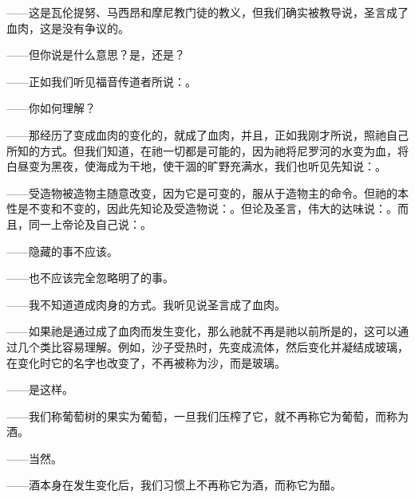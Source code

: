 ——这是瓦伦提努、马西昂和摩尼教门徒的教义，但我们确实被教导说，圣言成了血肉，这是没有争议的。\par

——但你说是什么意思？是，还是？\par

——正如我们听见福音传道者所说：。\par

——你如何理解？\par

——那经历了变成血肉的变化的，就成了血肉，并且，正如我刚才所说，照祂自己所知的方式。但我们知道，在祂一切都是可能的，因为祂将尼罗河的水变为血，将白昼变为黑夜，使海成为干地，使干涸的旷野充满水，我们也听见先知说：。\par

——受造物被造物主随意改变，因为它是可变的，服从于造物主的命令。但祂的本性是不变和不变的，因此先知论及受造物说：。但论及圣言，伟大的达味说：。而且，同一上帝论及自己说：。\par

——隐藏的事不应该。\par

——也不应该完全忽略明了的事。\par

——我不知道道成肉身的方式。我听见说圣言成了血肉。\par

——如果祂是通过成了血肉而发生变化，那么祂就不再是祂以前所是的，这可以通过几个类比容易理解。例如，沙子受热时，先变成流体，然后变化并凝结成玻璃，在变化时它的名字也改变了，不再被称为沙，而是玻璃。\par

——是这样。\par

——我们称葡萄树的果实为葡萄，一旦我们压榨了它，就不再称它为葡萄，而称为酒。\par

——当然。\par

——酒本身在发生变化后，我们习惯上不再称它为酒，而称它为醋。\par

